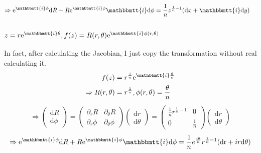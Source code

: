 \documentclass[]{ctexart}
\newcommand{\mi}{\mathbbmtt{i}}
\newcommand{\di}{\mathrm{d}}
\newcommand{\pa}{\partial}
\newcommand{\me}{\mathrm{e}}
\begin{document}
				\begin{equation*}
				\begin{aligned}
					\Rightarrow \me ^{\mi \phi }\di R+R\me ^{\mi \phi}\mi \di \phi&=\frac{1}{n}z^{\frac{1}{n}-1}(\di x+\mi \di y)
				\end{aligned}
				\end{equation*}
				
		\subsubsection{$z=r\me ^{\mi \theta},f(z)=R(r,\theta)\me ^{\mi \phi(r,\theta)}$}
			In fact, after calculating the Jacobian, I just copy the transformation without real calculating it. 
				\begin{equation*}
				\begin{aligned}
					f(z)&=r^{\frac{1}{n}}\me ^{\mi\frac{\theta}{n}}\\
					\Rightarrow R(r,\theta)&=r^{\frac{1}{n}},\phi(r,\theta)=\frac{\theta}{n}
				\end{aligned}
				\end{equation*}
				\begin{equation*}
				\begin{aligned}
					\Rightarrow
					\begin{pmatrix}
						\di R\\
						\di \phi
					\end{pmatrix}
					=
					\begin{pmatrix}
						\pa_rR & \pa_{\theta}R\\
						\pa_r\phi & \pa_{\theta}\phi
					\end{pmatrix}
					\begin{pmatrix}
						\di r\\
						\di \theta
					\end{pmatrix}
					=
					\begin{pmatrix}
						\frac{1}{n}r^{\frac{1}{n}-1} & 0\\
						0 & \frac{1}{n}
					\end{pmatrix}
					\begin{pmatrix}
						\di r\\
						\di \theta
					\end{pmatrix}
				\end{aligned}
				\end{equation*}
				\begin{equation*}
				\begin{aligned}
					\Rightarrow \me ^{\mi \phi }\di R+R\me ^{\mi \phi}\mi \di \phi=\frac{1}{n}e^{\frac{i \theta }{n}} r^{\frac{1}{n}-1} (\text{dr}+i  r\text{d}\theta)
				\end{aligned}
				\end{equation*}
		
\end{document}
